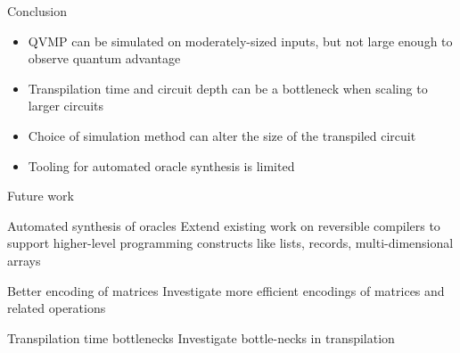 \documentclass[10pt]{beamer}
\begin{document}
\begin{frame}{Conclusion}
  \begin{itemize}
    \item QVMP can be simulated on moderately-sized inputs, but not large
      enough to observe quantum advantage
    \item Transpilation time and circuit depth can be a bottleneck when scaling to larger circuits
    \item Choice of simulation method can alter the size of the transpiled
      circuit
    \item Tooling for automated oracle synthesis is limited
  \end{itemize}
\end{frame}


\begin{frame}{Future work}
  \begin{exampleblock}{Automated synthesis of oracles}
    Extend existing work on reversible compilers to support higher-level
    programming constructs like lists, records, multi-dimensional arrays
  \end{exampleblock}
  \begin{exampleblock}{Better encoding of matrices}
    Investigate more efficient encodings of matrices and related operations
  \end{exampleblock}
  \begin{exampleblock}{Transpilation time bottlenecks}
    Investigate bottle-necks in transpilation
  \end{exampleblock}
\end{frame}
\end{document}
